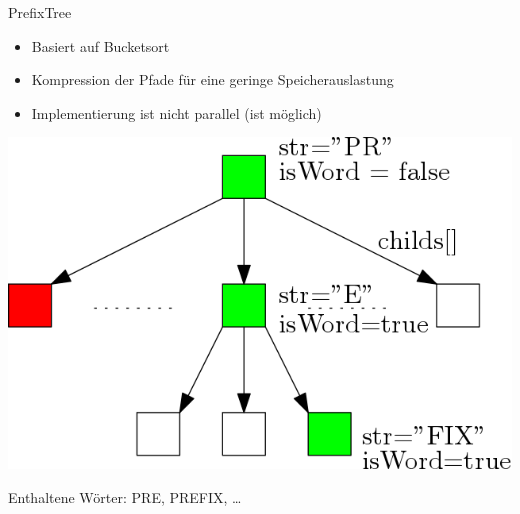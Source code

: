 \documentclass[11pt, xcolor=dvipsnames]{beamer}
\begin{document}
	
	\begin{frame}{PrefixTree}
		\begin{itemize}
			\item Basiert auf Bucketsort\\						
			\item Kompression der Pfade für eine geringe Speicherauslastung
			\item Implementierung ist nicht parallel (ist möglich)
		\end{itemize}
		\begin{center}
		\includegraphics[scale=0.3]{pics/prefixtree.png}
		
		Enthaltene Wörter: PRE, PREFIX, \ldots
		\end{center}
		

	\end{frame}
	
\end{document}
